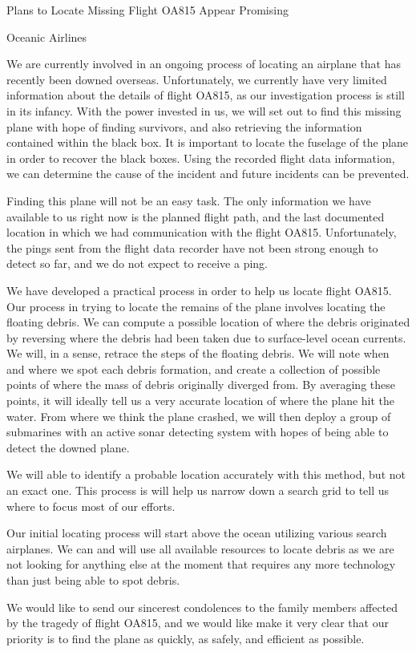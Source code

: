 \documentclass[pre,12pt]{revtex4-1}
\begin{document}
\begin{center}
\Large Plans to Locate Missing Flight OA815 Appear Promising


\large Oceanic Airlines

\date{\today}
\end{center}
\normalsize

We are currently involved in an ongoing process of locating an airplane that has recently been downed overseas. 
Unfortunately, we currently have very limited information about the details of flight OA815, as our investigation process is still in its infancy. With the power invested in us, we will set out to find this missing plane with hope of finding survivors, and also retrieving the information contained within the black box. It is important to locate the fuselage of the plane in order to recover the black boxes. Using the recorded flight data information, we can determine the cause of the incident and future incidents can be prevented.

Finding this plane will not be an easy task. The only information we have available to us right now is the planned flight path, and the last documented location in which we had communication with the flight OA815. Unfortunately, the pings sent from the flight data recorder have not been strong enough to detect so far, and we do not expect to receive a ping.

We have developed a practical process in order to help us locate flight  OA815. Our process in trying to locate the remains of the plane involves locating the floating debris. We can compute a possible location of where the debris originated by reversing where the debris had been taken due to surface-level ocean currents. We will, in a sense, retrace the steps of the floating debris.
We will note when and where we spot each debris formation, and create a collection of possible points of where the mass of debris originally diverged from. By averaging these points, it will ideally tell us a very accurate location of where the plane hit the water. From where we think the plane crashed, we will then deploy a group of submarines with an active sonar detecting system with hopes of being able to detect the downed plane. 

We will able to identify a probable location accurately with this method, but not an exact one. This process is will help us narrow down a search grid to tell us where to focus most of our efforts.

Our initial locating process will start above the ocean utilizing various search airplanes. We can and will use all available resources to locate debris as we are not looking for anything else at the moment that requires any more technology than just being able to spot debris. 

We would like to send our sincerest condolences to the family members affected by the tragedy of flight  OA815, and we would like make it very clear that our priority is to find the plane as quickly, as safely, and efficient as possible.	
\end{document}
